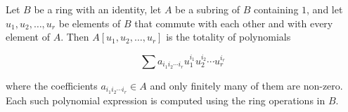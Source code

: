 Let $B$ be a ring with an identity, let $A$ be a subring of $B$ containing $1$, and let $u_1, u_2, \dots, u_r$ be elements of $B$ that commute with each other and with every element of $A$. Then $A[u_1, u_2, \dots, u_r]$ is the totality of polynomials

$$
\sum a_{i_1 i_2 \cdots i_r} u_1^{i_1} u_2^{i_2} \cdots u_r^{i_r}
$$

where the coefficients $a_{i_1 i_2 \cdots i_r} \in A$ and only finitely many of them are non-zero. Each such polynomial expression is computed using the ring operations in $B$.
